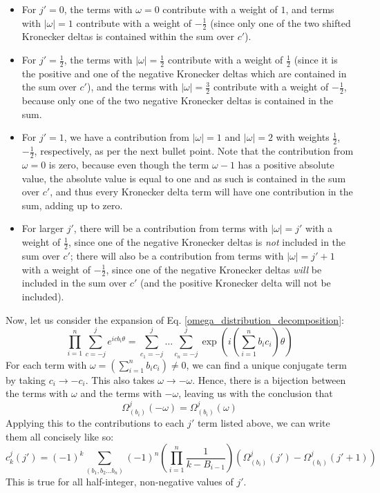 \documentclass[12pt]{article}
\begin{document}
	\begin{itemize}
	\item For $j'=0$, the terms with $\omega=0$ contribute with a weight of $1$, and terms with $|\omega|= 1$ contribute with a weight of $-\frac{1}{2}$ (since only one of the two shifted Kronecker deltas is contained within the sum over $c'$).
	\item For $j'=\frac{1}{2}$, the terms with $|\omega|=\frac{1}{2}$ contribute with a weight of $\frac{1}{2}$ (since it is the positive and one of the negative Kronecker deltas which are contained in the sum over $c'$), and the terms with $|\omega|=\frac{3}{2}$ contribute with a weight of $-\frac{1}{2}$, because only one of the two negative Kronecker deltas is contained in the sum.
	\item For $j'=1$, we have a contribution from $|\omega|=1$ and $|\omega|=2$ with weights $\frac{1}{2}$, $-\frac{1}{2}$, respectively, as per the next bullet point. Note that the contribution from $\omega = 0$ is zero, because even though the term $\omega-1$ has a positive absolute value, the absolute value is equal to one and as such is contained in the sum over $c'$, and thus every Kronecker delta term will have one contribution in the sum, adding up to zero.
	\item For larger $j'$, there will be a contribution from terms with $|\omega|=j'$ with a weight of $\frac{1}{2}$, since one of the negative Kronecker deltas is \textit{not} included in the sum over $c'$; there will also be a contribution from terms with $|\omega|=j'+1$ with a weight of $-\frac{1}{2}$, since one of the negative Kronecker deltas \textit{will} be included in the sum over $c'$ (and the positive Kronecker delta will not be included).
	\end{itemize}
	Now, let us consider the expansion of Eq. \ref{omega_distribution_decomposition}:
	\begin{equation}
	\prod_{i=1}^n \sum_{c=-j}^j e^{icb_i\theta}=\sum_{c_1=-j}^j\dots\sum_{c_n=-j}^j \exp(i\left(\sum_{i=1}^n b_ic_i\right)\theta)
	\end{equation}
	For each term with $\omega = \left(\sum_{i=1}^n b_ic_i\right)\neq 0$, we can find a unique conjugate term by taking $c_i\to-c_i$. This also takes $\omega\to-\omega$. Hence, there is a bijection between the terms with $\omega$ and the terms with $-\omega$, leaving us with the conclusion that
	\begin{equation}
	\Omega^j_{(b_i)}(-\omega)=\Omega^j_{(b_i)}(\omega)
	\end{equation}
	Applying this to the contributions to each $j'$ term listed above, we can write them all concisely like so:
	\begin{equation}
	c^j_k(j')=(-1)^k\sum_{(b_1, b_2\dots b_n)}(-1)^n\left(\prod_{i=1}^n \frac{1}{k-B_{i-1}}\right)\left(\Omega^j_{(b_i)}(j')-\Omega^j_{(b_i)}(j'+1)\right)
	\end{equation}
	This is true for all half-integer, non-negative values of $j'$.
	
	\begin{thebibliography}{10}



\end{thebibliography}	
	
\end{document}
